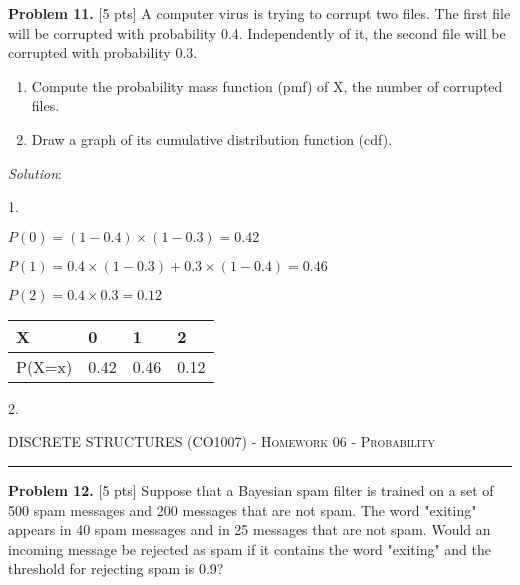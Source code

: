 \documentclass[12pt]{amsart}
\begin{document}
\bigskip 
\textbf{Problem 11. }[5 pts] A computer virus is trying to corrupt two files. The first file will be corrupted with
probability 0.4. Independently of it, the second file will be corrupted with probability 0.3.
\begin{enumerate}
    \item Compute the probability mass function (pmf) of X, the number of corrupted files.
    \item Draw a graph of its cumulative distribution function (cdf).
\end{enumerate}
\bigskip

\textit{Solution}:

1.

$P(0) = (1-0.4)\times (1-0.3) = 0.42$

$P(1) = 0.4\times (1-0.3) + 0.3\times (1-0.4) = 0.46$

$P(2) = 0.4\times 0.3 = 0.12$

\begin{table}[h]
\begin{tabular}{|l|l|l|l|}
\hline
X      & 0    & 1    & 2    \\ \hline
P(X=x) & 0.42 & 0.46 & 0.12 \\ \hline
\end{tabular}
\end{table}
2.

\newpage
{\scshape } \hfill {\scshape DISCRETE STRUCTURES (CO1007) - Homework 06 - Probability} \hfill {\scshape }
 
\smallskip

\hrule

\bigskip

\bigskip 
\textbf{Problem 12. }[5 pts] Suppose that a Bayesian spam filter is trained on a set of 500 spam messages and 200
messages that are not spam. The word "exiting" appears in 40 spam messages and in 25 messages that are
not spam. Would an incoming message be rejected as spam if it contains the word "exiting" and the threshold
for rejecting spam is 0.9?
\bigskip
\end{document}
